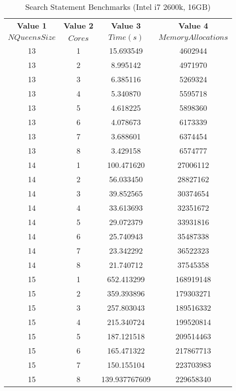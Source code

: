 \documentclass{article}
\begin{document}
\begin{table}[h!]
  \begin{center}
    \caption{Search Statement Benchmarks (Intel i7 2600k, 16GB)}
    \label{tab:table2}
    \begin{tabular}{c|c|c|c} %
      \textbf{Value 1} & \textbf{Value 2} & \textbf{Value 3} & \textbf{Value 4}\\
      $NQueens Size$ & $Cores$ & $Time(s)$ & $Memory Allocations$ \\
      \hline
13 & 1 & 15.693549 & 4602944\\
13 & 2 & 8.995142 & 4971970\\
13 & 3 & 6.385116 & 5269324\\
13 & 4 & 5.340870 & 5595718\\
13 & 5 & 4.618225 & 5898360\\
13 & 6 & 4.078673 & 6173339\\
13 & 7 & 3.688601 & 6374454\\
13 & 8 & 3.429158 & 6574777\\
14 & 1 & 100.471620 & 27006112\\
14 & 2 & 56.033450 & 28827162\\
14 & 3 & 39.852565 & 30374654\\
14 & 4 & 33.613693 & 32351672\\
14 & 5 & 29.072379 & 33931816\\
14 & 6 & 25.740943 & 35487338\\
14 & 7 & 23.342292 & 36522323\\
14 & 8 & 21.740712 & 37545358\\
15 & 1 & 652.413299 & 168919148\\
15 & 2 & 359.393896 & 179303271\\
15 & 3 & 257.803043 & 189516332\\
15 & 4 & 215.340724 & 199520814\\
15 & 5 & 187.121518 & 209514463\\
15 & 6 & 165.471322 & 217867713\\
15 & 7 & 150.155104 & 223703983\\
15 & 8 & 139.937767609 & 229658340\\
    \end{tabular}
  \end{center}
\end{table}
\end{document}
